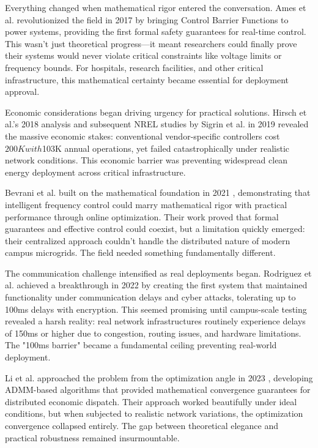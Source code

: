 \documentclass[12pt]{article}
\begin{document}
Everything changed when mathematical rigor entered the conversation. Ames et al. revolutionized the field in 2017 \cite{ames2017} by bringing Control Barrier Functions to power systems, providing the first formal safety guarantees for real-time control. This wasn't just theoretical progress—it meant researchers could finally prove their systems would never violate critical constraints like voltage limits or frequency bounds. For hospitals, research facilities, and other critical infrastructure, this mathematical certainty became essential for deployment approval.

Economic considerations began driving urgency for practical solutions. Hirsch et al.'s 2018 analysis \cite{hirsch2018} and subsequent NREL studies by Sigrin et al. in 2019 \cite{sigrin2019} revealed the massive economic stakes: conventional vendor-specific controllers cost $200K with $103K annual operations, yet failed catastrophically under realistic network conditions. This economic barrier was preventing widespread clean energy deployment across critical infrastructure.

Bevrani et al. built on the mathematical foundation in 2021 \cite{bevrani2021}, demonstrating that intelligent frequency control could marry mathematical rigor with practical performance through online optimization. Their work proved that formal guarantees and effective control could coexist, but a limitation quickly emerged: their centralized approach couldn't handle the distributed nature of modern campus microgrids. The field needed something fundamentally different.

The communication challenge intensified as real deployments began. Rodriguez et al. achieved a breakthrough in 2022 \cite{rodriguez2022} by creating the first system that maintained functionality under communication delays and cyber attacks, tolerating up to 100ms delays with encryption. This seemed promising until campus-scale testing revealed a harsh reality: real network infrastructures routinely experience delays of 150ms or higher due to congestion, routing issues, and hardware limitations. The "100ms barrier" became a fundamental ceiling preventing real-world deployment.

Li et al. approached the problem from the optimization angle in 2023 \cite{li2023}, developing ADMM-based algorithms that provided mathematical convergence guarantees for distributed economic dispatch. Their approach worked beautifully under ideal conditions, but when subjected to realistic network variations, the optimization convergence collapsed entirely. The gap between theoretical elegance and practical robustness remained insurmountable.
\end{document}
